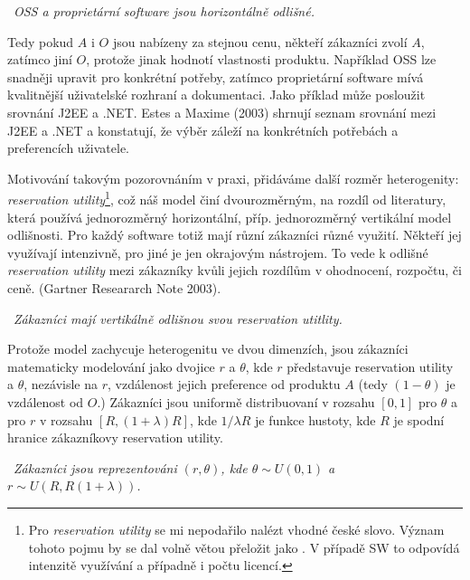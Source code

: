\begin{multicols}{2}
	\vspace{10pt}
	~{\em OSS a proprietární software jsou horizontálně odlišné.}
	\vspace{10pt}

	Tedy pokud $A$ i $O$ jsou nabízeny za stejnou cenu, někteří zákazníci zvolí $A$, zatímco jiní $O$, protože jinak hodnotí vlastnosti produktu. Například OSS lze snadněji upravit pro konkrétní potřeby, zatímco proprietární software mívá kvalitnější uživatelské rozhraní a dokumentaci. Jako příklad může posloužit srovnání J2EE a .NET. Estes a Maxime (2003) shrnují seznam srovnání mezi J2EE a .NET a konstatují, že výběr záleží na konkrétních potřebách a preferencích  uživatele.

	Motivování takovým pozorovnáním v praxi, přidáváme další rozměr heterogenity: {\em reservation utility}\footnote{Pro {\em reservation utility} se mi nepodařilo nalézt vhodné české slovo. Význam tohoto pojmu by se dal volně větou přeložit jako . V případě SW to odpovídá intenzitě využívání a případně i počtu licencí.}, což náš model činí dvourozměrným, na rozdíl od literatury, která používá jednorozměrný horizontální, příp. jednorozměrný vertikální model odlišnosti. Pro každý software totiž mají různí zákazníci různé využití. Někteří jej využívají intenzivně, pro jiné je jen okrajovým nástrojem. To vede k odlišné {\em reservation utility} mezi zákazníky kvůli jejich rozdílům v ohodnocení, rozpočtu, či ceně. (Gartner Researarch Note 2003).

	\vspace{10pt}
	~{\em Zákazníci mají vertikálně odlišnou svou reservation utitlity.}
	\vspace{10pt}

	Protože model zachycuje heterogenitu ve dvou dimenzích, jsou zákazníci matematicky modelování jako dvojice $r$ a $\theta$, kde $r$ představuje reservation utility a $\theta$, nezávisle na $r$, vzdálenost jejich preference od produktu $A$ (tedy $(1-\theta)$ je vzdálenost od $O$.) Zákazníci jsou uniformě distribuovaní v rozsahu $[0,1]$ pro $\theta$ a pro $r$ v rozsahu $[R, (1+\lambda)R]$, kde $1/\lambda R$ je funkce hustoty, kde $R$ je spodní hranice zákazníkovy reservation utility.

		\vspace{10pt}
		~{\em Zákazníci jsou reprezentováni $(r,\theta)$, kde $\theta \sim U(0,1)$ a $r \sim U(R, R(1+\lambda))$.}
		\vspace{10pt}


\end{multicols}

